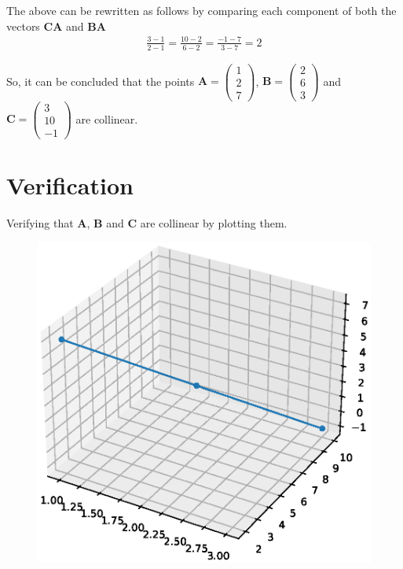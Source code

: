 \documentclass[journal,12pt,twocolumn]{IEEEtran}
\begin{document}
The above can be rewritten as follows by comparing each component of both the vectors $\textbf{CA}$ and $\textbf{BA}$
\begin{multline}
\frac{3 - 1}{2 - 1} = \frac{10 - 2}{6 - 2} = \frac{-1 - 7}{3 - 7} = 2
\end{multline}

So, it can be concluded that the points $\textbf{A} = \begin{pmatrix} 1 \\ 2 \\ 7 \end{pmatrix}$, $\textbf{B} = \begin{pmatrix} 2 \\ 6 \\ 3 \end{pmatrix}$ and $\textbf{C} = \begin{pmatrix} 3 \\ 10 \\ -1 \end{pmatrix}$ are collinear.

\section {Verification}
Verifying that \textbf{A}, \textbf{B} and \textbf{C} are collinear by plotting them.

\begin{figure}[!ht]
	\centering
	\includegraphics[width=\columnwidth]{figs/Plot.eps}
\end{figure}
\end{document}
